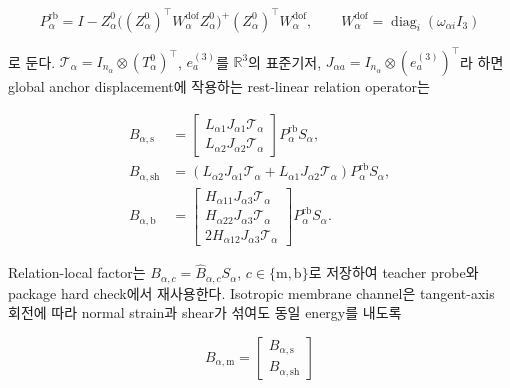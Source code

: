 \documentclass[11pt,a4paper]{article}
\newcommand{\R}{\mathbb{R}}
\newcommand{\diag}{\operatorname{diag}}
\begin{document}
\begin{equation}
  P_\alpha^{\mathrm{rb}}
  =I-Z_\alpha^0
  \bigl((Z_\alpha^0)^\top
        W_\alpha^{\mathrm{dof}}Z_\alpha^0\bigr)^+
  (Z_\alpha^0)^\top W_\alpha^{\mathrm{dof}},
  \qquad
  W_\alpha^{\mathrm{dof}}
  =\diag_i(\omega_{\alpha i}I_3)
\end{equation}

로 둔다.
\(\mathcal T_\alpha=I_{n_\alpha}\otimes(T_\alpha^0)^\top\),
\(e_a^{(3)}\)를 \(\R^3\)의 표준기저,
\(J_{\alpha a}=I_{n_\alpha}\otimes(e_a^{(3)})^\top\)라 하면
global anchor displacement에 작용하는 rest-linear relation operator는

\begin{equation}
\begin{aligned}
  B_{\alpha,\mathrm{s}}
  &=
  \begin{bmatrix}
    L_{\alpha1}J_{\alpha1}\mathcal T_\alpha\\
    L_{\alpha2}J_{\alpha2}\mathcal T_\alpha
  \end{bmatrix}
  P_\alpha^{\mathrm{rb}}S_\alpha,\\
  B_{\alpha,\mathrm{sh}}
  &=
  \left(
    L_{\alpha2}J_{\alpha1}\mathcal T_\alpha+
    L_{\alpha1}J_{\alpha2}\mathcal T_\alpha
  \right)P_\alpha^{\mathrm{rb}}S_\alpha,\\
  B_{\alpha,\mathrm{b}}
  &=
  \begin{bmatrix}
    H_{\alpha11}J_{\alpha3}\mathcal T_\alpha\\
    H_{\alpha22}J_{\alpha3}\mathcal T_\alpha\\
    2H_{\alpha12}J_{\alpha3}\mathcal T_\alpha
  \end{bmatrix}
  P_\alpha^{\mathrm{rb}}S_\alpha.
  \label{eq:exact-relation-strain-operators}
\end{aligned}
\end{equation}

Relation-local factor는
\(B_{\alpha,c}=\widehat B_{\alpha,c}S_\alpha\),
\(c\in\{\mathrm m,\mathrm b\}\)로 저장하여 teacher probe와 package hard check에서 재사용한다.
Isotropic membrane channel은 tangent-axis 회전에 따라 normal strain과 shear가 섞여도
동일 energy를 내도록

\begin{equation}
  B_{\alpha,\mathrm m}
  =
  \begin{bmatrix}
    B_{\alpha,\mathrm s}\\
    B_{\alpha,\mathrm{sh}}
  \end{bmatrix}
  \label{eq:relation-membrane-operator}
\end{equation}
\end{document}
